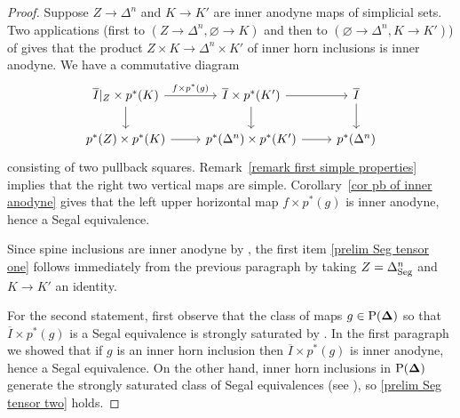 \documentclass{amsart}
\numberwithin{theorem}{subsection}
\theoremstyle{definition}
\newcommand{\olI}{\overline{I}}
\newcommand{\Pre}{\name{P}}
\newcommand{\name}[1]{\ensuremath{\text{\textup{#1}}}}
\newcommand{\simp}{\mathbf{\Delta}}
\newcommand{\Seg}{\name{Seg}}
\begin{document}
\begin{proof}
Suppose $Z \to \Delta^n$ and $K\to K'$ are inner anodyne maps of simplicial sets.
Two applications (first to $(Z\to \Delta^n, \varnothing \to K)$ and then to $(\varnothing \to \Delta^n, K \to K')$) of \cite[Corollary 2.3.2.4]{ht} gives that the product $Z\times K\to \Delta^n\times K'$ of inner horn inclusions is inner anodyne.
We have a commutative diagram
	\[
	\begin{tikzcd}
	\olI|_Z \times p^*(K) \arrow{r}{f \times p^*(g)} \arrow{d} & {\olI} \times p^* (K') \arrow{r} \arrow{d} &
	\olI \arrow{d}\\
	p^*(Z) \times p^* (K) \arrow{r} & p^*(\Delta^n) \times p^* (K')\arrow{r} & p^{*}(\Delta^n)
	\end{tikzcd}
	\]
consisting of two pullback squares. 
Remark~\ref{remark first simple properties} implies that the right two vertical maps are simple.
Corollary~\ref{cor pb of inner anodyne} gives that the left upper horizontal map $f \times p^*(g)$ is inner anodyne, hence a Segal equivalence.

Since spine inclusions are inner anodyne by \cite[Proposition 2.13]{Quadern45}, the first item \eqref{prelim Seg tensor one} follows immediately from the previous paragraph by taking $Z = \Delta^n_\Seg$ and $K\to K'$ an identity.

For the second statement, first observe that the class of maps $g \in \Pre(\simp)$ so that $\olI \times p^*(g)$ is a Segal equivalence is strongly saturated by \cite[Remark 5.5.4.10]{ht}.
In the first paragraph we showed that if $g$ is an inner horn inclusion then $\olI \times p^*(g)$ is inner anodyne, hence a Segal equivalence.
On the other hand, inner horn inclusions in $\Pre(\simp)$ generate the strongly saturated class of Segal equivalences (see \cite[Proposition 2.7.7]{ChuHaugseng}), so \eqref{prelim Seg tensor two} holds.
\end{proof}
\end{document}
